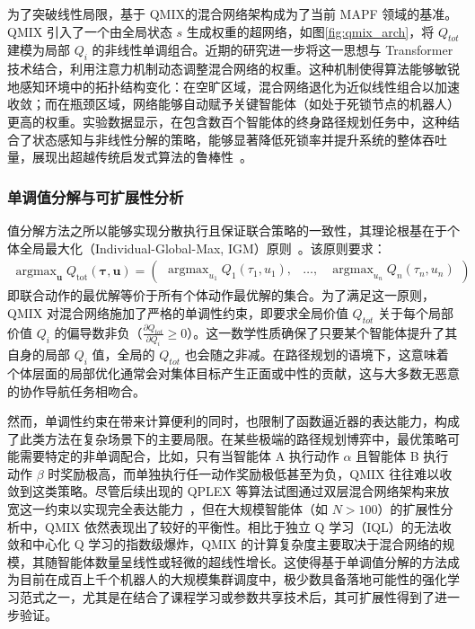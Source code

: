 \documentclass[13.5pt]{extarticle}
\newcommand{\figref}[1]{\hypersetup{linkcolor=red}\ref{#1}}
\begin{document}
为了突破线性局限，基于 QMIX的混合网络架构成为了当前 MAPF 领域的基准。QMIX 引入了一个由全局状态 $s$ 生成权重的超网络，如图\figref{fig:qmix_arch}，将 $Q_{tot}$ 建模为局部 $Q_i$ 的非线性单调组合。近期的研究进一步将这一思想与 Transformer 技术结合，利用注意力机制动态调整混合网络的权重。这种机制使得算法能够敏锐地感知环境中的拓扑结构变化：在空旷区域，混合网络退化为近似线性组合以加速收敛；而在瓶颈区域，网络能够自动赋予关键智能体（如处于死锁节点的机器人）更高的权重。实验数据显示，在包含数百个智能体的终身路径规划任务中，这种结合了状态感知与非线性分解的策略，能够显著降低死锁率并提升系统的整体吞吐量，展现出超越传统启发式算法的鲁棒性~\cite{shao2024transformer, zhang2023heterogeneous}。

\subsubsection{单调值分解与可扩展性分析}

值分解方法之所以能够实现分散执行且保证联合策略的一致性，其理论根基在于个体全局最大化（Individual-Global-Max, IGM）原则~\cite{son2019qtran}。该原则要求： 
\begin{align}
    \operatorname{argmax}_{\mathbf{u}} Q_{\text{tot}}(\boldsymbol{\tau}, \mathbf{u}) = \begin{pmatrix} 
        \operatorname{argmax}_{u_1} Q_1(\tau_1, u_1), & 
        \dots, & 
        \operatorname{argmax}_{u_n} Q_n(\tau_n, u_n) 
    \end{pmatrix}
\end{align}
即联合动作的最优解等价于所有个体动作最优解的集合。为了满足这一原则，QMIX 对混合网络施加了严格的单调性约束，即要求全局价值 $Q_{tot}$ 关于每个局部价值 $Q_i$ 的偏导数非负（$\frac{\partial Q_{tot}}{\partial Q_i} \ge 0$）。这一数学性质确保了只要某个智能体提升了其自身的局部 $Q_i$ 值，全局的 $Q_{tot}$ 也会随之非减。在路径规划的语境下，这意味着个体层面的局部优化通常会对集体目标产生正面或中性的贡献，这与大多数无恶意的协作导航任务相吻合。

然而，单调性约束在带来计算便利的同时，也限制了函数逼近器的表达能力，构成了此类方法在复杂场景下的主要局限。在某些极端的路径规划博弈中，最优策略可能需要特定的非单调配合，比如，只有当智能体 A 执行动作 $\alpha$ 且智能体 B 执行动作 $\beta$ 时奖励极高，而单独执行任一动作奖励极低甚至为负，QMIX 往往难以收敛到这类策略。尽管后续出现的 QPLEX 等算法试图通过双层混合网络架构来放宽这一约束以实现完全表达能力~\cite{wang2020qplex}，但在大规模智能体（如 $N > 100$）的扩展性分析中，QMIX 依然表现出了较好的平衡性。相比于独立 Q 学习（IQL）的无法收敛和中心化 Q 学习的指数级爆炸，QMIX 的计算复杂度主要取决于混合网络的规模，其随智能体数量呈线性或轻微的超线性增长。这使得基于单调值分解的方法成为目前在成百上千个机器人的大规模集群调度中，极少数具备落地可能性的强化学习范式之一，尤其是在结合了课程学习或参数共享技术后，其可扩展性得到了进一步验证\cite{hu2020voronoi}。
\end{document}
